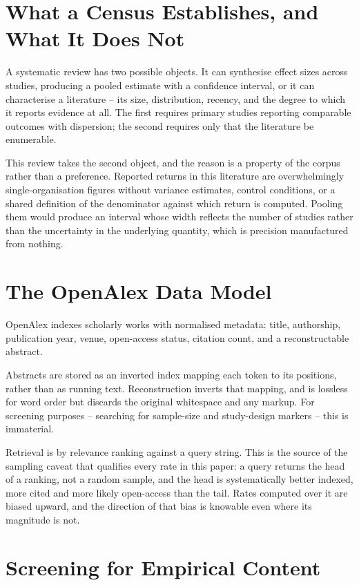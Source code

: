 \documentclass[10pt,journal,compsoc,twocolumn]{IEEEtran}
\begin{document}
\section{What a Census Establishes, and What It Does Not}


A systematic review has two possible objects. It can synthesise effect sizes across studies, producing a pooled estimate with a confidence interval, or it can characterise a literature -- its size, distribution, recency, and the degree to which it reports evidence at all. The first requires primary studies reporting comparable outcomes with dispersion; the second requires only that the literature be enumerable.

This review takes the second object, and the reason is a property of the corpus rather than a preference. Reported returns in this literature are overwhelmingly single-organisation figures without variance estimates, control conditions, or a shared definition of the denominator against which return is computed. Pooling them would produce an interval whose width reflects the number of studies rather than the uncertainty in the underlying quantity, which is precision manufactured from nothing.


\section{The OpenAlex Data Model}


OpenAlex indexes scholarly works with normalised metadata: title, authorship, publication year, venue, open-access status, citation count, and a reconstructable abstract.

Abstracts are stored as an inverted index mapping each token to its positions, rather than as running text. Reconstruction inverts that mapping, and is lossless for word order but discards the original whitespace and any markup. For screening purposes -- searching for sample-size and study-design markers -- this is immaterial.

Retrieval is by relevance ranking against a query string. This is the source of the sampling caveat that qualifies every rate in this paper: a query returns the head of a ranking, not a random sample, and the head is systematically better indexed, more cited and more likely open-access than the tail. Rates computed over it are biased upward, and the direction of that bias is knowable even where its magnitude is not.


\section{Screening for Empirical Content}
\end{document}
